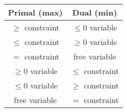 \documentclass[usenames,dvipsnames,8pt]{beamer}%
\begin{document}
\begin{frame}
  \begin{table}[ht]
    \centering
    \begin{tabular}{cc}
      \toprule
      Primal (max) & Dual (min) \\
      \midrule
      $\geqslant$ constraint & $\leqslant 0$ variable \\
      $\leqslant$ constraint & $\geqslant 0$ variable \\
      $=$ constraint & free variable \\
      $\geqslant 0$ variable & $\leqslant$ constraint \\
      $\leqslant 0$ variable & $\geqslant$ constraint \\
      free variable & $=$ constraint \\
      \bottomrule
   \end{tabular}
 \end{table}
\end{frame}
\end{document}
